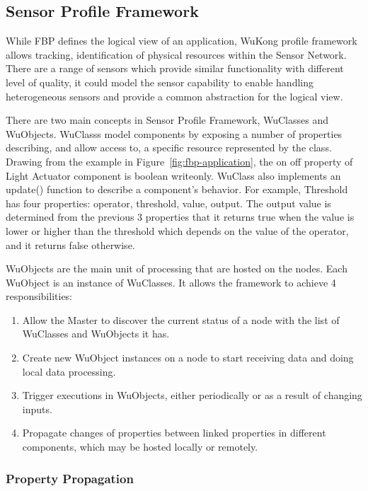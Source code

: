 \subsection{Sensor Profile Framework}

While FBP defines the logical view of an application, WuKong profile framework allows
tracking, identification of physical resources within the Sensor Network.
There are a range of sensors which provide similar functionality with different
level of quality, it could model the sensor capability to enable handling
heterogeneous sensors and provide a common abstraction for the logical view.

There are two main concepts in Sensor Profile Framework, WuClasses and
WuObjects. WuClasss model components by exposing a number of properties
describing, and allow access to, a specific resource represented by the class.
Drawing from the example in Figure~\ref{fig:fbp-application}, the on off property of Light
Actuator component is boolean writeonly. WuClass also implements an update()
function to describe a component's behavior. For
example, Threshold has four properties: operator, threshold, value, output. The
output value is determined from the previous 3 properties that it returns true
when the value is lower or higher than the threshold which depends on the value
of the operator, and it returns false otherwise.


WuObjects are the main unit of processing that are hosted on the nodes. Each
WuObject is an instance of WuClasses. It allows the framework to achieve
4 responsibilities:
\begin{enumerate}
\item Allow the Master to discover the current status of a node with the list
of WuClasses and WuObjects it has.
\item Create new WuObject instances on a node to start receiving data and doing
local data processing.
\item Trigger executions in WuObjects, either periodically or as a result of
changing inputs.
\item Propagate changes of properties between linked properties in different
components, which may be hosted locally or remotely.
\end{enumerate}

\subsubsection{Property Propagation}

